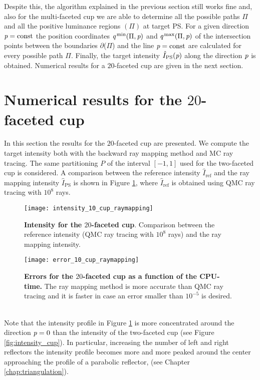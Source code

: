 Despite this, the algorithm explained in the previous section still works fine and, also for the multi-faceted cup we are able to determine all the possible paths $\Pi$ and all the positive luminance regions $(\Pi)$ at target PS.
For a given direction $\textit{p}=\mbox{const}$ the position coordinates $\textit{q}^\textrm{\,min}(\Pi,\textit{p})$ and $\textit{q}^\textrm{\,max}(\Pi,\textit{p})$ of the intersection points between the boundaries $ \partial$($\Pi$) and the line $\textit{p}= \mbox{const}$ are calculated for every possible path $\Pi$. Finally, the target intensity $\hat{I}_{\textrm{PS}}(\textit{p})$ along the direction $\textit{p}$ is obtained.
Numerical results for a $20$-faceted cup are given in the next section.
\section{Numerical results for the $20$-faceted cup}
\label{sec:Numerical results_10cup}
In this section the results for the $20$-faceted cup are presented.
We compute the target intensity both with the backward ray mapping method and MC ray tracing.
The same partitioning $P$ of the interval $[-1,1]$ used for the two-faceted cup is considered. A comparison between the reference intensity $\hat{I}_{\textrm{ref}}$ and the ray mapping intensity $\hat{I}_{\textrm{PS}}$ is shown in Figure \ref{fig:intensity10cup}, where $\hat{I}_{\textrm{ref}}$ is obtained using QMC ray tracing with $10^8$ rays.
\begin{figure}[h!]
\centering
\texttt{[image: intensity\_10\_cup\_raymapping]}
\caption{\textbf{Intensity for the $20$-faceted cup}.
Comparison between the reference intensity (QMC ray tracing with $10^8$ rays) and the ray mapping intensity.}
\label{fig:intensity10cup}
\end{figure}
\begin{figure}[h!]
\centering
\texttt{[image: error\_10\_cup\_raymapping]}
\caption{\textbf{Errors for the $20$-faceted cup as a function of the CPU-time.} The ray mapping method is more accurate than QMC ray tracing and it is faster in case an error smaller than $10^{-5}$ is desired.}
\label{fig:error10cup} 
\end{figure}
\\ \indent Note that the intensity profile in Figure \ref{fig:intensity10cup} is more concentrated around the direction $\textit{p}=0$ than the intensity of the two-faceted cup (see Figure \ref{fig:intensity_cup}). In particular, increasing the number of left and right reflectors the intensity profile becomes more and more peaked around the center approaching the profile of a parabolic reflector, (see Chapter \ref{chap:triangulation}).
